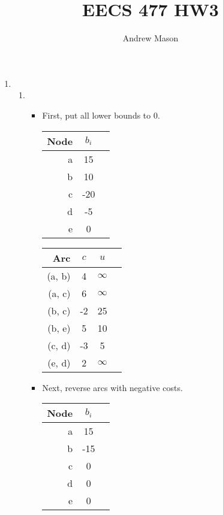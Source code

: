 \documentclass[12pt]{article}
\title{EECS 477 HW3}
\author{Andrew Mason}
\begin{document}
\maketitle

\begin{enumerate}
  \item
    \begin{enumerate}
      \item
        \begin{itemize}
          \item First, put all lower bounds to 0.\\
            \begin{tabular}{|r|c|c|}
              \hline
              Node & $b_i$ \\\hline
              a & 15 \\ \hline
              b & 10 \\ \hline
              c & -20 \\ \hline
              d & -5 \\ \hline
              e & 0 \\ \hline
            \end{tabular}
            \begin{tabular}{|r|c|c|c|}
              \hline
              Arc & $c$ & $u$ \\ \hline
              (a, b) & 4 & $\infty$ \\ \hline
              (a, c) & 6 & $\infty$ \\ \hline
              (b, c) & -2 & 25 \\ \hline
              (b, e) & 5 & 10 \\ \hline
              (c, d) & -3 & 5 \\ \hline
              (e, d) & 2 & $\infty$ \\ \hline
            \end{tabular}
          \item Next, reverse arcs with negative costs.\\
            \begin{tabular}{|r|c|c|}
              \hline
              Node & $b_i$ \\\hline
              a & 15 \\ \hline
              b & -15 \\ \hline
              c & 0 \\ \hline
              d & 0 \\ \hline
              e & 0 \\ \hline

\end{tabular}
\end{itemize}
\end{enumerate}
\end{enumerate}
\end{document}
